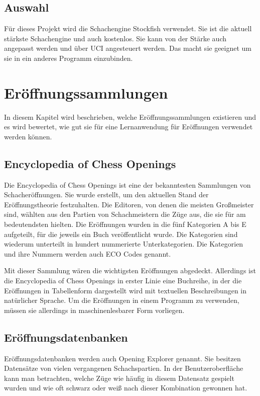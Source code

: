 \subsection{Auswahl}
Für dieses Projekt wird die Schachengine Stockfish verwendet. Sie ist die aktuell stärkste Schachengine und auch kostenlos. Sie kann von der Stärke auch angepasst werden und über \ac{UCI} angesteuert werden. Das macht sie geeignet um sie in ein anderes Programm einzubinden.

\section{Eröffnungssammlungen}
In diesem Kapitel wird beschrieben, welche Eröffnungssammlungen existieren und es wird bewertet, wie gut sie für eine Lernanwendung für Eröffnungen verwendet werden können.

\subsection{Encyclopedia of Chess Openings}
Die Encyclopedia of Chess Openings ist eine der bekanntesten Sammlungen von Schacheröffnungen. Sie wurde erstellt, um den aktuellen Stand der Eröffnungstheorie festzuhalten.
Die Editoren, von denen die meisten Großmeister sind, wählten aus den Partien von Schachmeistern die Züge aus, die sie für am bedeutendsten hielten. Die Eröffnungen wurden in die fünf Kategorien A bis E aufgeteilt, für die jeweils ein Buch veröffentlicht wurde. Die Kategorien sind wiederum unterteilt in hundert nummerierte Unterkategorien. Die Kategorien und ihre Nummern werden auch ECO Codes genannt.
\cite{wikipedia_foundation_inc_encyclopaedia_2024}

Mit dieser Sammlung wären die wichtigsten Eröffnungen abgedeckt. Allerdings ist die Encyclopedia of Chess Openings in erster Linie eine Buchreihe, in der die Eröffnungen in Tabellenform dargestellt wird mit textuellen Beschreibungen in natürlicher Sprache. Um die Eröffnungen in einem Programm zu verwenden, müssen sie allerdings in maschinenlesbarer Form vorliegen.

\subsection{Eröffnungsdatenbanken}
Eröffnungsdatenbanken werden auch Opening Explorer genannt. Sie besitzen Datensätze von vielen vergangenen Schachspartien. In der Benutzeroberfläche kann man betrachten, welche Züge wie häufig in diesem Datensatz gespielt wurden und wie oft schwarz oder weiß nach dieser Kombination gewonnen hat. 

